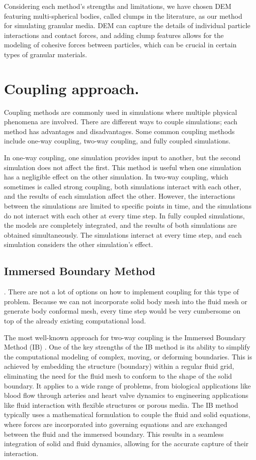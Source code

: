 Considering each method's strengths and limitations, we have chosen DEM featuring multi-spherical bodies, called clumps in the literature, as our method for simulating granular media. DEM can capture the details of individual particle interactions and contact forces, and adding clump features allows for the modeling of cohesive forces between particles, which can be crucial in certain types of granular materials. 

\section{Coupling approach.}

Coupling methods are commonly used in simulations where multiple physical phenomena are involved. There are different ways to couple simulations; each method has advantages and disadvantages. Some common coupling methods include one-way coupling, two-way coupling, and fully coupled simulations.

In one-way coupling, one simulation provides input to another, but the second simulation does not affect the first. This method is useful when one simulation has a negligible effect on the other simulation. In two-way coupling, which sometimes is called strong coupling, both simulations interact with each other, and the results of each simulation affect the other. However, the interactions between the simulations are limited to specific points in time, and the simulations do not interact with each other at every time step. In fully coupled simulations, the models are completely integrated, and the results of both simulations are obtained simultaneously. The simulations interact at every time step, and each simulation considers the other simulation's effect.

\subsection{Immersed Boundary Method}.
There are not a lot of options on how to implement coupling for this type of problem. Because we can not incorporate solid body mesh into the fluid mesh or generate body conformal mesh, every time step would be very cumbersome on top of the already existing computational load. 

The most well-known approach for two-way coupling is the Immersed Boundary Method (\ac{IB}) \cite{mittal2005immersed}. One of the key strengths of the IB method is its ability to simplify the computational modeling of complex, moving, or deforming boundaries. This is achieved by embedding the structure (boundary) within a regular fluid grid, eliminating the need for the fluid mesh to conform to the shape of the solid boundary. It applies to a wide range of problems, from biological applications like blood flow through arteries and heart valve dynamics to engineering applications like fluid interaction with flexible structures or porous media. The IB method typically uses a mathematical formulation to couple the fluid and solid equations, where forces are incorporated into governing equations and are exchanged between the fluid and the immersed boundary. This results in a seamless integration of solid and fluid dynamics, allowing for the accurate capture of their interaction. 

